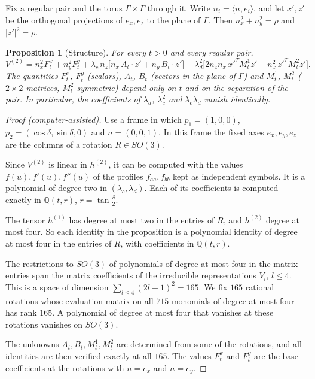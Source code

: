 \documentclass[11pt]{amsart}
\newtheorem{proposition}[theorem]{Proposition}
\theoremstyle{definition}
\theoremstyle{remark}
\newcommand{\Q}{\mathbb{Q}}
\begin{document}
Fix a regular pair and the torus $\Gamma\times\Gamma$ through it. Write $n_i=\langle n,e_i\rangle$, and let $x',z'$ be the orthogonal projections of $e_x,e_z$ to the plane of $\Gamma$. Then $n_x^2+n_y^2=\rho$ and $|z'|^2=\rho$.

\begin{proposition}[Structure]\label{prop:structure}
For every $t>0$ and every regular pair,
\[ V^{(2)}=n_x^2F^x_t+n_y^2F^y_t+\lambda_c\,n_z\big[n_x\,A_t\cdot z'+n_y\,B_t\cdot z'\big]+\lambda_d^2\big[2n_zn_x\,x'^{T}M^1_tz'+n_x^2\,z'^{T}M^2_tz'\big]. \]
The quantities $F^x_t$, $F^y_t$ (scalars), $A_t$, $B_t$ (vectors in the plane of $\Gamma$) and $M^1_t$, $M^2_t$ ($2\times2$ matrices, $M^2_t$ symmetric) depend only on $t$ and on the separation of the pair. In particular, the coefficients of $\lambda_d$, $\lambda_c^2$ and $\lambda_c\lambda_d$ vanish identically.
\end{proposition}

\begin{proof}[Proof (computer-assisted)]
Use a frame in which $p_1=(1,0,0)$, $p_2=(\cos\delta,\sin\delta,0)$ and $n=(0,0,1)$. In this frame the fixed axes $e_x,e_y,e_z$ are the columns of a rotation $R\in SO(3)$.

Since $V^{(2)}$ is linear in $h^{(2)}$, it can be computed with the values $f(u),f'(u),f''(u)$ of the profiles $f_{aa},f_{bb}$ kept as independent symbols. It is a polynomial of degree two in $(\lambda_c,\lambda_d)$. Each of its coefficients is computed exactly in $\Q(t,r)$, $r=\tan\frac\delta2$.

The tensor $h^{(1)}$ has degree at most two in the entries of $R$, and $h^{(2)}$ degree at most four. So each identity in the proposition is a polynomial identity of degree at most four in the entries of $R$, with coefficients in $\Q(t,r)$.

The restrictions to $SO(3)$ of polynomials of degree at most four in the matrix entries span the matrix coefficients of the irreducible representations $V_l$, $l\le4$. This is a space of dimension $\sum_{l\le4}(2l+1)^2=165$. We fix $165$ rational rotations whose evaluation matrix on all $715$ monomials of degree at most four has rank $165$. A polynomial of degree at most four that vanishes at these rotations vanishes on $SO(3)$.

The unknowns $A_t,B_t,M^1_t,M^2_t$ are determined from some of the rotations, and all identities are then verified exactly at all $165$. The values $F^x_t$ and $F^y_t$ are the base coefficients at the rotations with $n=e_x$ and $n=e_y$.
\end{proof}
\end{document}
